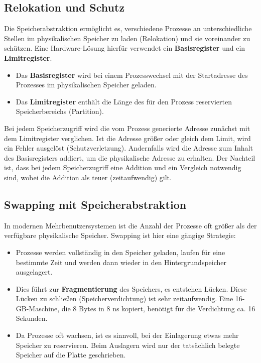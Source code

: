\subsection{Relokation und Schutz}
Die Speicherabstraktion ermöglicht es, verschiedene Prozesse an
unterschiedliche Stellen im physikalischen Speicher zu laden (Relokation) und
sie voreinander zu schützen. Eine Hardware-Lösung hierfür verwendet ein
\textbf{Basisregister} und ein \textbf{Limitregister}.
\begin{itemize}
    \item Das \textbf{Basisregister} wird bei einem Prozesswechsel mit der Startadresse
          des Prozesses im physikalischen Speicher geladen.
    \item Das \textbf{Limitregister} enthält die Länge des für den Prozess reservierten
          Speicherbereichs (Partition).
\end{itemize}
Bei jedem Speicherzugriff wird die vom Prozess generierte Adresse zunächst mit dem Limitregister verglichen. Ist die Adresse größer oder gleich dem Limit, wird ein Fehler ausgelöst (Schutzverletzung). Andernfalls wird die Adresse zum Inhalt des Basisregisters addiert, um die physikalische Adresse zu erhalten. Der Nachteil ist, dass bei jedem Speicherzugriff eine Addition und ein Vergleich notwendig sind, wobei die Addition als teuer (zeitaufwendig) gilt.

\subsection{Swapping mit Speicherabstraktion}
In modernen Mehrbenutzersystemen ist die Anzahl der Prozesse oft größer als der
verfügbare physikalische Speicher. Swapping ist hier eine gängige Strategie:
\begin{itemize}
    \item Prozesse werden vollständig in den Speicher geladen, laufen für eine bestimmte
          Zeit und werden dann wieder in den Hintergrundspeicher ausgelagert.
    \item Dies führt zur \textbf{Fragmentierung} des Speichers, es entstehen Lücken.
          Diese Lücken zu schließen (Speicherverdichtung) ist sehr zeitaufwendig. Eine
          16-GB-Maschine, die 8 Bytes in 8 ns kopiert, benötigt für die Verdichtung ca.
          16 Sekunden.
    \item Da Prozesse oft wachsen, ist es sinnvoll, bei der Einlagerung etwas mehr
          Speicher zu reservieren. Beim Auslagern wird nur der tatsächlich belegte
          Speicher auf die Platte geschrieben.
\end{itemize}

